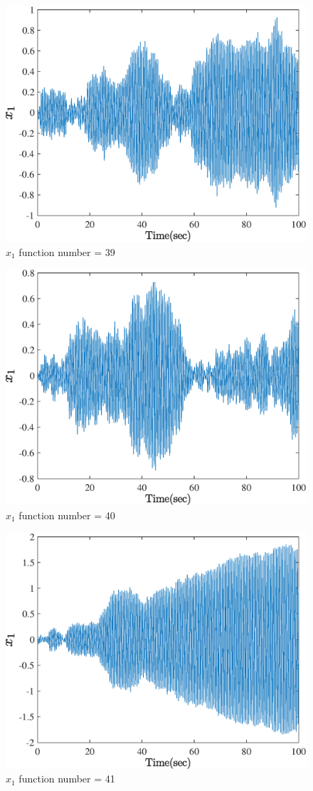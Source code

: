   \begin{figure}[H] 
  	\caption{$x_1$ function number = 39} 
  	\centering 
  	\includegraphics[width=12cm]{../Figure/Q5/part_a/39} 
  \end{figure}
  \begin{figure}[H] 
  	\caption{$x_1$ function number = 40} 
  	\centering 
  	\includegraphics[width=12cm]{../Figure/Q5/part_a/40} 
  \end{figure}
  \begin{figure}[H] 
  	\caption{$x_1$ function number = 41} 
  	\centering 
  	\includegraphics[width=12cm]{../Figure/Q5/part_a/41} 
  \end{figure}
